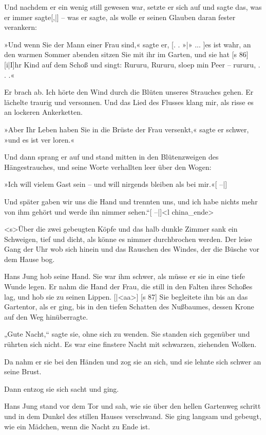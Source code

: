 Und nachdem er ein wenig still gewesen war,
setzte er sich auf und sagte das, was er immer sagte[,|]
– was er sagte, als wolle er seinen Glauben daran
fester verankern:

»Und wenn Sie der Mann einer Frau sind,«
sagte er, [. . »|» ... ]es ist wahr, an den warmen Sommer­
abenden sitzen Sie mit ihr im Garten, und sie hat
[s 86]
[i|I]hr Kind auf dem Schoß und singt: Rururu, Rururu,
sloep min Peer – rururu, . . .«

Er brach ab. Ich hörte den Wind durch die
Blüten unseres Strauches gehen. Er lächelte traurig
und versonnen. Und das Lied des Flusses klang
mir, als risse es an lockeren Ankerketten.

»Aber Ihr Leben haben Sie in die Brüste der
Frau versenkt,« sagte er schwer, »und es ist ver­
loren.«

Und dann sprang er auf und stand mitten in
den Blütenzweigen des Hängestrauches, und seine
Worte verhallten leer über den Wogen:

»Ich will vielem Gast sein – und will nirgends
bleiben als bei mir.«[ –|]

Und später gaben wir uns die Hand und
trennten uns, und ich habe nichts mehr von ihm
gehört und werde ihn nimmer sehen.“[ –|]<l china_ende>

<s>Über die zwei gebeugten Köpfe und das halb­
dunkle Zimmer sank ein Schweigen, tief und dicht,
als könne es nimmer durchbrochen werden. Der leise
Gang der Uhr wob sich hinein und das Rauschen
des Windes, der die Büsche vor dem Hause bog.

Hans Jung hob seine Hand. Sie war ihm schwer,
als müsse er sie in eine tiefe Wunde legen. Er nahm
die Hand der Frau, die still in den Falten ihres
Schoßes lag, und hob sie zu seinen Lippen.
[|<aa>]
[s 87]
Sie begleitete ihn bis an das Gartentor, als er
ging, bis in den tiefen Schatten des Nußbaumes,
dessen Krone auf den Weg hinüberragte.

„Gute Nacht,“ sagte sie, ohne sich zu wenden.
Sie standen sich gegenüber und rührten sich nicht.
Es war eine finstere Nacht mit schwarzen, ziehenden
Wolken.

Da nahm er sie bei den Händen und zog sie
an sich, und sie lehnte sich schwer an seine Brust.

Dann entzog sie sich sacht und ging.

Hans Jung stand vor dem Tor und sah, wie
sie über den hellen Gartenweg schritt und in dem
Dunkel des stillen Hauses verschwand. Sie ging
langsam und gebeugt, wie ein Mädchen, wenn die
Nacht zu Ende ist.

